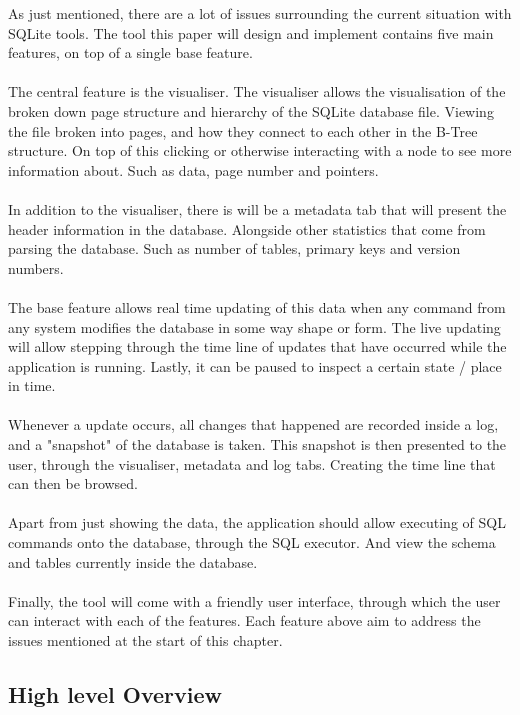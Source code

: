 As just mentioned, there are a lot of issues surrounding the current situation with SQLite tools. The tool this paper will design and implement contains five main features, on top of a single base feature.
\\\\
The central feature is the visualiser. The visualiser allows the visualisation of the broken down page structure and hierarchy of the SQLite database file. Viewing the file broken into pages, and how they connect to each other in the B-Tree structure. On top of this clicking or otherwise interacting with a node to see more information about. Such as data, page number and pointers.
\\\\
In addition to the visualiser, there is will be a metadata tab that will present the header information in the database. Alongside other statistics that come from parsing the database. Such as number of tables, primary keys and version numbers.
\\\\
The base feature allows real time updating of this data when any command from any system modifies the database in some way shape or form. The live updating will allow stepping through the time line of updates that have occurred while the application is running. Lastly, it can be paused to inspect a certain state / place in time. 
\\\\
Whenever a update occurs, all changes that happened are recorded inside a log, and a "snapshot" of the database is taken. This snapshot is then presented to the user, through the visualiser, metadata and log tabs. Creating the time line that can then be browsed. 
\\\\
Apart from just showing the data, the application should allow executing of SQL commands onto the database, through the SQL executor. And view the schema and tables currently inside the database. 
\\\\
Finally, the tool will come with a friendly user interface, through which the user can interact with each of the features. Each feature above aim to address the issues mentioned at the start of this chapter.

\subsection{High level Overview}
\label{subsec:high_level_overview}

